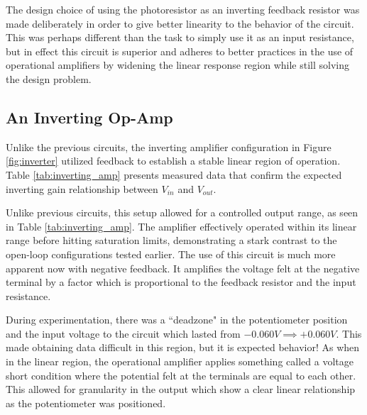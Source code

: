 \documentclass[12pt]{article}
\begin{document}
The design choice of using the photoresistor as an inverting feedback resistor
was made deliberately in order to give better linearity to the behavior of the
circuit. This was perhaps different than the task to simply use it as an input
resistance, but in effect this circuit is superior and adheres to better
practices in the use of operational amplifiers by widening the linear response
region while still solving the design problem.
\subsection{An Inverting Op-Amp}
Unlike the previous circuits, the inverting amplifier configuration in Figure \ref{fig:inverter} utilized feedback to establish a stable linear region of operation. Table \ref{tab:inverting_amp} presents measured data that confirm the expected inverting gain relationship between $V_{in}$ and $V_{out}$.

Unlike previous circuits, this setup allowed for a controlled output range, as
seen in Table \ref{tab:inverting_amp}. The amplifier effectively operated within
its linear range before hitting saturation limits, demonstrating a stark
contrast to the open-loop configurations tested earlier. The use of this circuit
is much more apparent now with negative feedback. It amplifies the voltage felt
at the negative terminal by a factor which is proportional to the feedback
resistor and the input resistance.

During experimentation, there was a ``deadzone" in the potentiometer position
and the input voltage to the circuit which lasted from \(-0.060V \implies
+0.060V\). This made obtaining data difficult in this region, but it is expected
behavior! As when in the linear region, the operational amplifier applies
something called a voltage short condition where the potential felt at the
terminals are equal to each other. This allowed for granularity in the output
which show a clear linear relationship as the potentiometer was positioned.
\end{document}
